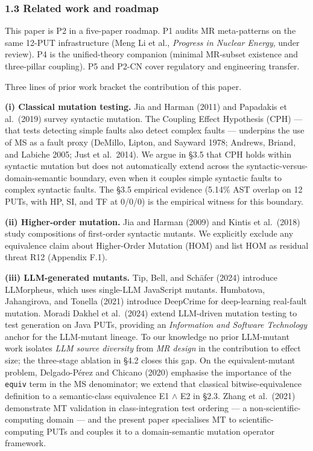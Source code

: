 \documentclass[review,12pt,authoryear]{elsarticle}
\begin{document}
\subsubsection{1.3 Related work and
roadmap}\label{related-work-and-roadmap}

This paper is P2 in a five-paper roadmap. P1 audits MR meta-patterns on
the same 12-PUT infrastructure (Meng Li et al., \emph{Progress in
Nuclear Energy}, under review). P4 is the unified-theory companion
(minimal MR-subset existence and three-pillar coupling). P5 and P2-CN
cover regulatory and engineering transfer.

Three lines of prior work bracket the contribution of this paper.

\textbf{(i) Classical mutation testing.} Jia and Harman (2011) and
Papadakis et al.~(2019) survey syntactic mutation. The Coupling Effect
Hypothesis (CPH) --- that tests detecting simple faults also detect
complex faults --- underpins the use of MS as a fault proxy (DeMillo,
Lipton, and Sayward 1978; Andrews, Briand, and Labiche 2005; Just et
al.~2014). We argue in §3.5 that CPH holds within syntactic mutation but
does not automatically extend across the
syntactic-versus-domain-semantic boundary, even when it couples simple
syntactic faults to complex syntactic faults. The §3.5 empirical
evidence (5.14\% AST overlap on 12 PUTs, with HP, SI, and TF at 0/0/0)
is the empirical witness for this boundary.

\textbf{(ii) Higher-order mutation.} Jia and Harman (2009) and Kintis et
al.~(2018) study compositions of first-order syntactic mutants. We
explicitly exclude any equivalence claim about Higher-Order Mutation
(HOM) and list HOM as residual threat R12 (Appendix F.1).

\textbf{(iii) LLM-generated mutants.} Tip, Bell, and Schäfer (2024)
introduce LLMorpheus, which uses single-LLM JavaScript mutants.
Humbatova, Jahangirova, and Tonella (2021) introduce DeepCrime for
deep-learning real-fault mutation. Moradi Dakhel et al.~(2024) extend
LLM-driven mutation testing to test generation on Java PUTs, providing
an \emph{Information and Software Technology} anchor for the LLM-mutant
lineage. To our knowledge no prior LLM-mutant work isolates \emph{LLM
source diversity} from \emph{MR design} in the contribution to effect
size; the three-stage ablation in §4.2 closes this gap. On the
equivalent-mutant problem, Delgado-Pérez and Chicano (2020) emphasise
the importance of the \texttt{equiv} term in the MS denominator; we
extend that classical bitwise-equivalence definition to a semantic-class
equivalence E1 $\wedge$ E2 in §2.3. Zhang et al.~(2021) demonstrate MT
validation in class-integration test ordering --- a
non-scientific-computing domain --- and the present paper specialises MT
to scientific-computing PUTs and couples it to a domain-semantic
mutation operator framework.
\end{document}
